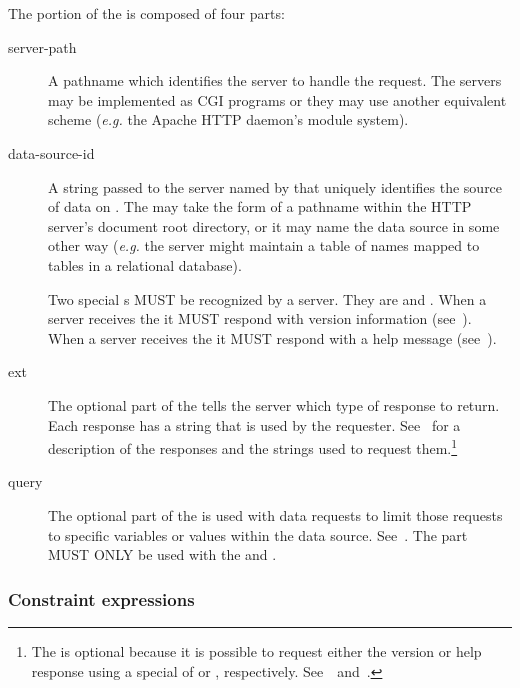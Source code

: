 \documentclass[justify]{nasa-ese}
\begin{document}
The  portion of the  is composed of four
parts:
\begin{description}
\item [server-path] A pathname which identifies the \DAP server to
  handle the request. The servers may be implemented as \ac{CGI}
  programs or they may use another equivalent scheme ({\it e.g.} the
  Apache \ac{HTTP} daemon's module system).

\item [data-source-id] A string passed to the server named by
   that uniquely identifies the source of data on
  . The  may take the form of a pathname
  within the \ac{HTTP} server's document root directory, or it may name the
  data source in some other way ({\it e.g.} the \DAP server might maintain a
  table of names mapped to tables in a relational database).
  
  Two special s MUST be recognized by a \DAP
  server. They are  and . When a \DAP server
  receives the   it MUST respond
  with version information (see~). When a \DAP
  server receives the   it MUST respond
  with a help message (see~).

\item [ext] The optional  part of the  tells
  the \DAP server which type of response to return. Each response has
  a string that is used by the requester.
  See~ for a description of the responses
  and the  strings used to request them.\footnote{The
     is optional because it is possible to request either the
    version or help response using a special  of
     or , respectively.
    See~~and~.}

\item [query] The optional  part of the  is
  used with data requests to limit those requests to specific
  variables or values within the data source.
  See~. The  part MUST ONLY be
  used with the  and  .
\end{description}

\subsubsection{Constraint expressions}
\label{sec-ce-syntax}
\end{document}
